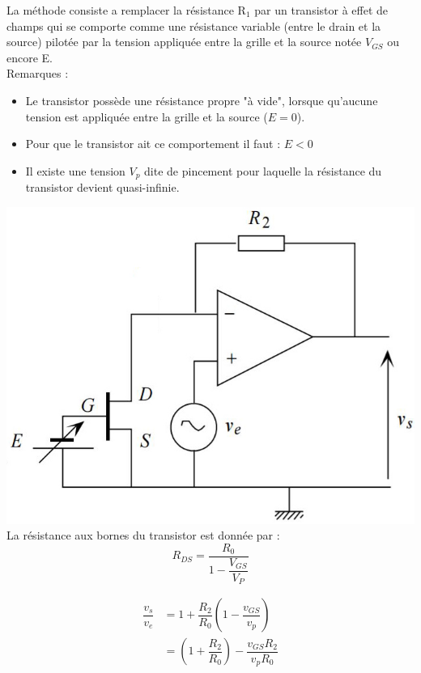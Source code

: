 \documentclass[12pt,a4paper]{article}
\begin{document}
\begin{enumerate}
La méthode consiste a remplacer la résistance R$_1$ par un transistor à effet de champs qui se comporte comme une résistance variable (entre le drain et la source) pilotée par la tension appliquée entre la grille et la source notée $V_{GS}$ ou encore E.\\
Remarques : 
\begin{itemize}[label=\textbullet]
\item Le transistor possède une résistance propre "à vide", lorsque qu'aucune tension est appliquée entre la grille et la source ($E=0$).
\item Pour que le transistor ait ce comportement il faut : $E<0$
\item Il existe une tension $V_p$ dite de pincement pour laquelle la résistance du transistor devient quasi-infinie.
\end{itemize}
\begin{multicols}{2}
\includegraphics[scale=0.4]{MontageAmpTrans}
\columnbreak
\\
La résistance aux bornes du transistor est donnée par :
$$R_{DS}=\dfrac{R_0}{1-\dfrac{V_{GS}}{V_P}}$$

\begin{align*}
\dfrac{v_s}{v_e}&=1+\dfrac {R_{2}} {R_{0}}( 1-\dfrac {v_{GS}} {v_{p}})\\
&=( 1+\dfrac {R_{2}} {R_{0}}) -\dfrac {v_{GS}R_{2}} {v_{p}R_{0}}
\end{align*}


\end{multicols}
\end{enumerate}
\end{document}
